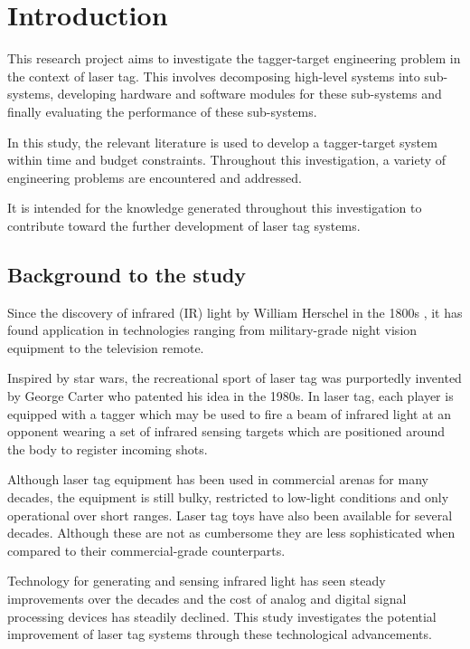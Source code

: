 \chapter{Introduction}
\label{ch_introduction}

This research project aims to investigate the tagger-target engineering problem in the context of laser tag.  This involves decomposing high-level systems into sub-systems, developing hardware and software modules for these sub-systems and finally evaluating the performance of these sub-systems.

In this study, the relevant literature is used to develop a tagger-target system within time and budget constraints. Throughout this investigation, a variety of engineering problems are encountered and addressed.

It is intended for the knowledge generated throughout this investigation to contribute toward the further development of laser tag systems.

\section{Background to the study}
Since the discovery of infrared (IR) light by William Herschel in the 1800s \cite{Rowan-Robinson2013}, it has found application in technologies ranging from military-grade night vision equipment to the television remote.

Inspired by star wars, the recreational sport of laser tag was purportedly invented by George Carter who patented his idea in the 1980s\cite{Carter1986}. In laser tag, each player is equipped with a tagger which may be used to fire a beam of infrared light at an opponent wearing a set of infrared sensing targets which are positioned around the body to register incoming shots.

Although laser tag equipment has been used in commercial arenas for many decades, the equipment is still bulky, restricted to low-light conditions and only operational over short ranges. Laser tag toys have also been available for several decades. Although these are not as cumbersome they are less sophisticated when compared to their commercial-grade counterparts.

Technology for generating and sensing infrared light has seen steady improvements over the decades and the cost of analog and digital signal processing devices has steadily declined. This study investigates the potential improvement of laser tag systems through these technological advancements.

